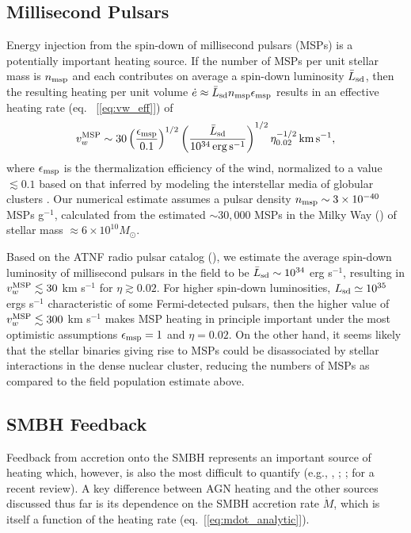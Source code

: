 \documentclass[usenatbib,fleqn]{mn2e}
\begin{document}
\subsection{Millisecond Pulsars}
 Energy injection from the spin-down of millisecond pulsars (MSPs) is a potentially
important heating source.  If the number of MSPs per unit stellar mass
is $n_{\rm msp}$ and each contributes on average a spin-down
luminosity $\bar{L}_{\rm sd}$, then the resulting heating per unit
volume $\dot{e} \approx \bar{L}_{\rm sd}n_{\rm msp}\epsilon_{\rm msp}$ results in an
effective heating rate (eq.~ [\ref{eq:vw_eff}]) of 
\begin{eqnarray} v_{w}^{\rm MSP} \sim
30\left(\frac{\epsilon_{\rm msp}}{0.1}\right)^{1/2}\left(\frac{\bar{L}_{\rm
sd}}{10^{34}\,{\rm erg\,s^{-1}}}\right)^{1/2} \eta_{0.02}^{-1/2}\,{\rm
km\,s^{-1}},
 \label{eq:vmsp}
  \end{eqnarray} 
where $\epsilon_{\rm msp}$ is the thermalization efficiency of
the wind, normalized to a value $\lesssim 0.1$ based on that inferred by modeling the interstellar media of globular clusters
\citep{NaimanSoares-Furtado+:2013a}.  Our numerical estimate assumes a
pulsar density $n_{\rm msp} \sim 3 \times 10^{-40} $ MSPs g$^{-1}$, calculated from the estimated $\sim 30,000$ MSPs in the Milky Way (\citealt{Lorimer13}) of stellar mass $\approx 6\times 10^{10}M_{\odot}$.

Based on the ATNF radio pulsar catalog (\citealt{Manchester+05}), we estimate the average spin-down luminosity of millisecond pulsars in the field to be $\bar{L}_{\rm sd} \sim 10^{34}$ erg s$^{-1}$, resulting in $v_{w}^{\rm MSP} \lesssim 30$ km s$^{-1}$ for $\eta \gtrsim 0.02$.  For higher spin-down
luminosities, $L_{\rm sd}\simeq 10^{35}$ ergs s$^{-1}$ characteristic
of some Fermi-detected pulsars, then the higher value of $v_{w}^{\rm MSP}
\lesssim 300$ km s$^{-1}$ makes MSP heating in principle important
under the most optimistic assumptions $\epsilon_{\rm msp} = 1$ and $\eta = 0.02$.  On the other hand, it seems likely that the stellar binaries giving rise to MSPs could be disassociated by stellar interactions in the dense nuclear cluster, reducing the numbers of MSPs as compared to the field population estimate above.  


\subsection{SMBH Feedback}

Feedback from accretion onto the SMBH represents an important source of heating which, however, is also the most difficult to quantify (e.g., \citealt{Brighenti&Mathews03}, \citealt{DiMatteo+05}; \citealt{Kurosawa&Proga09}; \citealt{Fabian12} for a recent review).  A key difference between AGN heating and the other sources discussed thus far is its dependence on the SMBH accretion rate $\dot{M}$, which is itself a function of the heating rate (eq.~[\ref{eq:mdot_analytic}]).  
\end{document}
